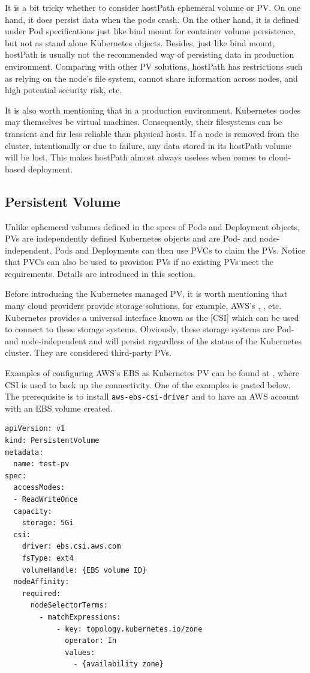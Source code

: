It is a bit tricky whether to consider hostPath ephemeral volume or PV. On one hand, it does persist data when the pods crash. On the other hand, it is defined under Pod specifications just like bind mount for container volume persistence, but not as stand alone Kubernetes objects. Besides, just like bind mount, hostPath is usually not the recommended way of persisting data in production environment. Comparing with other PV solutions, hostPath has restrictions such as relying on the node's file system, cannot share information across nodes, and high potential security risk, etc.

It is also worth mentioning that in a production environment, Kubernetes nodes may themselves be virtual machines. Consequently, their filesystems can be transient and far less reliable than physical hosts. If a node is removed from the cluster, intentionally or due to failure, any data stored in its hostPath volume will be lost. This makes hostPath almost always useless when comes to cloud-based deployment.

\subsection{Persistent Volume}

Unlike ephemeral volumes defined in the specs of Pods and Deployment objects, PVs are independently defined Kubernetes objects and are Pod- and node-independent. Pods and Deployments can then use PVCs to claim the PVs. Notice that PVCs can also be used to provision PVs if no existing PVs meet the requirements. Details are introduced in this section.

Before introducing the Kubernetes managed PV, it is worth mentioning that many cloud providers provide storage solutions, for example, AWS's , , etc. Kubernetes provides a universal interface known as the [CSI] which can be used to connect to these storage systems. Obviously, these storage systems are Pod- and node-independent and will persist regardless of the status of the Kubernetes cluster. They are considered third-party PVs.

Examples of configuring AWS's EBS as Kubernetes PV can be found at \cite{aws2024csiebsexamples}, where CSI is used to back up the connectivity. One of the examples is pasted below. The prerequisite is to install \texttt{aws-ebs-csi-driver} and to have an AWS account with an EBS volume created.
\begin{lstlisting}
apiVersion: v1
kind: PersistentVolume
metadata:
  name: test-pv
spec:
  accessModes:
  - ReadWriteOnce
  capacity:
    storage: 5Gi
  csi:
    driver: ebs.csi.aws.com
    fsType: ext4
    volumeHandle: {EBS volume ID}
  nodeAffinity:
    required:
      nodeSelectorTerms:
        - matchExpressions:
            - key: topology.kubernetes.io/zone
              operator: In
              values:
                - {availability zone}
\end{lstlisting}



